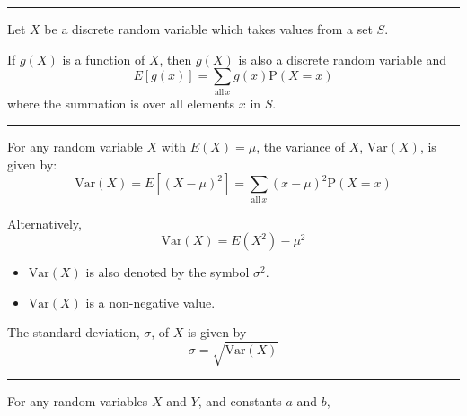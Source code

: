 \documentclass[11pt,a4paper]{book}
\begin{document}
\vspace{5pt}
\hrule
\vspace{6pt}

Let $X$ be a discrete random variable which takes values from a set
$S$.

If $g\left(X\right)$ is a function of $X$, then $g\left(X\right)$
is also a discrete random variable and 
\[
E\left[g\left(x\right)\right]=\sum_{\text{all}\,x}g\left(x\right)\text{P}\left(X=x\right)
\]
where the summation is over all elements $x$ in $S$.

\vspace{5pt}
\hrule
\vspace{6pt}

For any random variable $X$ with $E\left(X\right)=\mu$, the variance
of $X$, $\text{Var}\left(X\right)$, is given by:
\[
\text{Var}\left(X\right)=E\left[\left(X-\mu\right)^{2}\right]=\sum_{\text{all}\,x}\left(x-\mu\right)^{2}\text{P}\left(X=x\right)
\]

Alternatively, 
\[
\text{Var}\left(X\right)=E\left(X^{2}\right)-\mu^{2}
\]

\begin{itemize}
\item $\text{Var}\left(X\right)$ is also denoted by the symbol $\sigma^{2}$. 
\item $\text{Var}\left(X\right)$ is a non-negative value.
\end{itemize}
The standard deviation, $\sigma$, of $X$ is given by 
\[
\sigma=\sqrt{\text{Var}\left(X\right)}
\]

\vspace{5pt}
\hrule
\vspace{6pt}

For any random variables $X$ and $Y$, and constants $a$ and $b$,

\medskip{}
\end{document}

